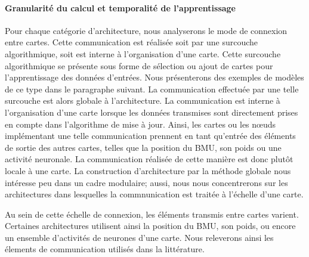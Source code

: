 \documentclass[../main]{subfiles}
\begin{document}
\paragraph{Granularité du calcul et temporalité de l'apprentissage}

Pour chaque catégorie d'architecture, nous analyserons le mode de connexion entre cartes. Cette communication est réalisée soit par une surcouche algorithmique, soit est interne à l'organisation d'une carte.
Cette surcouche algorithmique se présente sous forme de sélection ou ajout de cartes pour l'apprentissage des données d'entrées.
Nous présenterons des exemples de modèles de ce type dans le paragraphe suivant. La communication effectuée par une telle surcouche est alors globale à l'architecture.
La communication est interne à l'organisation d'une carte lorsque les données transmises sont directement prises en compte dans l'algorithme de mise à jour. Ainsi, les cartes ou les n\oe{}uds implémentant une telle communication prennent en tant qu'entrée des éléments de sortie des autres cartes, telles que la position du BMU, son poids ou une activité neuronale. La communication réalisée de cette manière est donc plutôt locale à une carte. 
La construction d'architecture par la méthode globale nous intéresse peu dans un cadre modulaire; aussi, nous nous concentrerons sur les architectures dans lesquelles la commnunication est traitée à l'échelle d'une carte.

Au sein de cette échelle de connexion, les éléments transmis entre cartes varient. 
Certaines architectures utilisent ainsi la position du BMU, son poids, ou encore un ensemble d'activités de neurones d'une carte. Nous releverons ainsi les élements de communication utilisés dans la littérature.
\end{document}
